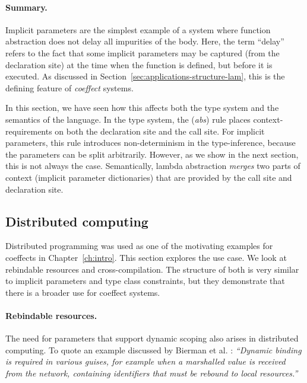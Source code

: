 \paragraph{Summary.}
Implicit parameters are the simplest example of a system where function abstraction does not
delay all impurities of the body. Here, the term ``delay'' refers to the fact that some
implicit parameters may be captured (from the declaration site) at the time when the function is
defined, but before it is executed. As discussed in Section~\ref{sec:applications-structure-lam},
this is the defining feature of \emph{coeffect} systems.

In this section, we have seen how this affects both the type system and the semantics of the
language. In the type system, the (\emph{abs}) rule places context-requirements on both the
declaration site and the call site. For implicit parameters, this rule introduces non-determinism
in the type-inference, because the parameters can be split arbitrarily. However, as we show in the
next section, this is not always the case. Semantically, lambda abstraction \emph{merges} two
parts of context (implicit parameter dictionaries) that are provided by the call site and
declaration site.


\subsection{Distributed computing}
\label{sec:applications-flat-distr}

Distributed programming was used as one of the motivating examples for coeffects in
Chapter~\ref{ch:intro}. This section explores the use case. We look at rebindable resources and
cross-compilation. The structure of both is very similar to implicit parameters and type
class constraints, but they demonstrate that there is a broader use for coeffect systems.


\paragraph{Rebindable resources.}

The need for parameters that support dynamic scoping also arises in distributed computing.
To quote an example discussed by Bierman et al. \cite{app-distributed-rebinding}: \emph{``Dynamic
binding is required in various guises, for example when a marshalled value is received from the
network, containing identifiers that must be rebound to local resources.''}

